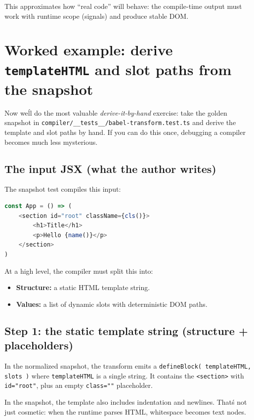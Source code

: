 This approximates how ``real code'' will behave: the compile-time output must work with runtime scope (signals) and produce stable DOM.

\section{Worked example: derive \texttt{templateHTML} and slot paths from the snapshot}

Now we\'ll do the most valuable \emph{derive-it-by-hand} exercise: take the golden snapshot in
	\texttt{compiler/\_\_tests\_\_/babel-transform.test.ts} and derive the template and slot paths by hand.
If you can do this once, debugging a compiler becomes much less mysterious.

\subsection{The input JSX (what the author writes)}

The snapshot test compiles this input:

\begin{lstlisting}[language=JavaScript]
const App = () => (
	<section id="root" className={cls()}>
		<h1>Title</h1>
		<p>Hello {name()}</p>
	</section>
)
\end{lstlisting}

At a high level, the compiler must split this into:

\begin{itemize}
\item \textbf{Structure:} a static HTML template string.
\item \textbf{Values:} a list of dynamic slots with deterministic DOM paths.
\end{itemize}

\subsection{Step 1: the static template string (structure + placeholders)}

In the normalized snapshot, the transform emits a \texttt{defineBlock({ templateHTML, slots })} where \texttt{templateHTML} is a single string.
It contains the \texttt{<section>} with \texttt{id="root"}, plus an empty \texttt{class=""} placeholder.

In the snapshot, the template also includes indentation and newlines.
That\'s not just cosmetic: when the runtime parses HTML, whitespace becomes text nodes.

